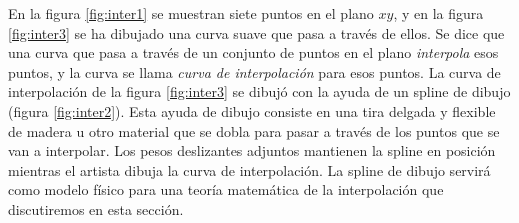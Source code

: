 En la figura \ref{fig:inter1} se muestran siete puntos en el plano $xy$, y en la figura \ref{fig:inter3} se ha dibujado una curva suave que pasa a través de ellos. Se dice que una curva que pasa a través de un conjunto de puntos en el plano \emph{interpola} esos puntos, y la curva se llama \emph{curva de interpolación} para esos puntos. La curva de interpolación de la figura \ref{fig:inter3} se dibujó con la ayuda de un spline de dibujo (figura \ref{fig:inter2}). Esta ayuda de dibujo consiste en una tira delgada y flexible de madera u otro material que se dobla para pasar a través de los puntos que se van a interpolar. Los pesos deslizantes adjuntos mantienen la spline en posición mientras el artista dibuja la curva de interpolación. La spline de dibujo servirá como modelo físico para una teoría matemática de la interpolación que discutiremos en esta sección.
